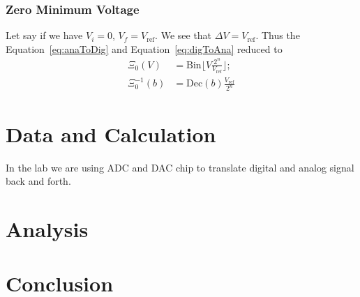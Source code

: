 \documentclass[aps,prl,reprint]{revtex4-1}
\begin{document}
    \subsubsection{Zero Minimum Voltage}
        Let say if we have $V_i = 0$, $V_f = V_\text{ref}$. We see that $\Delta V = V_\text{ref}$. Thus the Equation~\ref{eq:anaToDig} and Equation~\ref{eq:digToAna} reduced to
        \begin{align}
            \Xi_0 (V) &= \text{Bin}\lfloor V\frac{2^n}{V_\text{ref}} \rfloor; \label{eq:anaToDig.zero}\\ 
            \Xi^{-1}_0 (b)&= \text{Dec}(b) \frac{V_\text{ref}}{2^n} \label{eq:digToAna.zero}
        \end{align}
\section{Data and Calculation}
    In the lab we are using ADC and DAC chip to translate digital and analog signal back and forth.

\section{Analysis}


\section{Conclusion}







\end{document}
